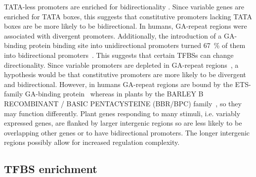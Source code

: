 \documentclass[../main.tex]{subfiles}
\begin{document}
TATA-less promoters are enriched for bidirectionality \autocite{dhadiGenomewideComparativeAnalysis2009}.
Since variable genes are enriched for TATA boxes, this suggests that constitutive promoters lacking TATA boxes are be more likely to be bidirectional.
In humans, GA\hyp{}repeat regions were associated with divergent promoters. Additionally, the introduction of a GA\hyp{}binding protein binding site into unidirectional promoters turned \SI{67}{\percent} of them into bidirectional promoters~\autocite{collinsEtsRelatedTranscriptionFactor2007}.
This suggests that certain TFBSs can change directionality.
Since variable promoters are depleted in GA\hyp{}repeat regions~\autocite{yamamotoHeterogeneityArabidopsisCore2009}, a hypothesis would be that constitutive promoters are more likely to be divergent and bidirectional.
However, in humans GA\hyp{}repeat regions are bound by the ETS\hyp{}family GA\hyp{}binding protein~\autocite{collinsEtsRelatedTranscriptionFactor2007} whereas in plants by the BARLEY B RECOMBINANT / BASIC PENTACYSTEINE (BBR/BPC) family~\autocite{theunePhylogeneticAnalysesGAGAMotif2019}, so they may function differently.
Plant genes responding to many stimuli, i.e. variably expressed genes, are flanked by larger intergenic regions \autocite{waltherRegulatoryCodeTranscriptional2007} so are less likely to be overlapping other genes or to have bidirectional promoters.
The longer intergenic regions possibly allow for increased regulation complexity.


\subsection{TFBS enrichment}
\end{document}
